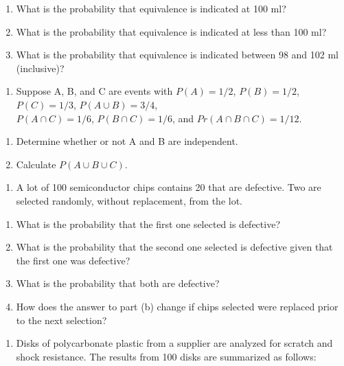\documentclass[]{book}
\providecommand{\tightlist}{%
  \setlength{\itemsep}{0pt}\setlength{\parskip}{0pt}}
\begin{document}
\begin{enumerate}
\def\labelenumi{(\alph{enumi})}
\tightlist
\item
  What is the probability that equivalence is indicated at 100 ml?
\item
  What is the probability that equivalence is indicated at less than 100 ml?
\item
  What is the probability that equivalence is indicated between 98 and 102 ml (inclusive)?
\end{enumerate}

\begin{enumerate}
\def\labelenumi{\arabic{enumi}.}
\setcounter{enumi}{10}
\tightlist
\item
  Suppose A, B, and C are events with \(P(A) = 1/2\), \(P(B) = 1/2\), \(P(C) = 1/3\), \(P(A \cup B) = 3/4\),\\
  \(P(A \cap C) = 1/6\), \(P(B \cap C) = 1/6\), and \(Pr(A \cap B \cap C) = 1/12\).
\end{enumerate}

\begin{enumerate}
\def\labelenumi{(\alph{enumi})}
\tightlist
\item
  Determine whether or not A and B are independent.
\item
  Calculate \(P(A \cup B \cup C)\).
\end{enumerate}

\begin{enumerate}
\def\labelenumi{\arabic{enumi}.}
\setcounter{enumi}{11}
\tightlist
\item
  A lot of 100 semiconductor chips contains 20 that are defective. Two are selected randomly, without replacement, from the lot.
\end{enumerate}

\begin{enumerate}
\def\labelenumi{(\alph{enumi})}
\tightlist
\item
  What is the probability that the first one selected is defective?
\item
  What is the probability that the second one selected is defective given that the first one was defective?
\item
  What is the probability that both are defective?
\item
  How does the answer to part (b) change if chips selected were replaced prior to the next selection?
\end{enumerate}

\begin{enumerate}
\def\labelenumi{\arabic{enumi}.}
\setcounter{enumi}{12}
\tightlist
\item
  Disks of polycarbonate plastic from a supplier are analyzed for scratch and shock resistance. The results from 100 disks are summarized as follows:
\end{enumerate}
\end{document}
